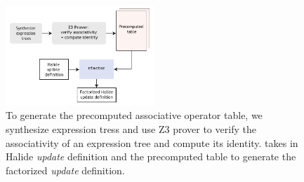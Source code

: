 \begin{figure}
\centering
\includegraphics[width=0.5\textwidth]{system}
\caption{To generate the precomputed associative operator table, we synthesize expression tress and use Z3 prover to verify the associativity of an expression tree and compute its identity.  takes in Halide \emph{update} definition and the precomputed table to generate the factorized \emph{update} definition.}
\label{fig:system}
\end{figure}
